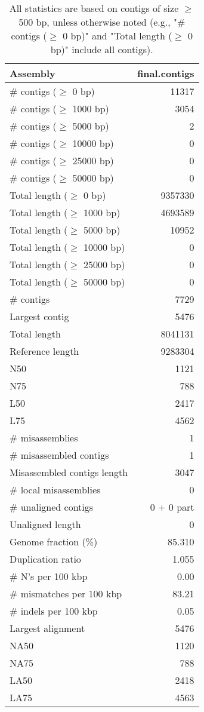 \documentclass[12pt,a4paper]{article}
\begin{document}
\begin{table}[ht]
\begin{center}
\caption{All statistics are based on contigs of size $\geq$ 500 bp, unless otherwise noted (e.g., "\# contigs ($\geq$ 0 bp)" and "Total length ($\geq$ 0 bp)" include all contigs).}
\begin{tabular}{|l*{1}{|r}|}
\hline
Assembly & final.contigs \\ \hline
\# contigs ($\geq$ 0 bp) & 11317 \\ \hline
\# contigs ($\geq$ 1000 bp) & 3054 \\ \hline
\# contigs ($\geq$ 5000 bp) & 2 \\ \hline
\# contigs ($\geq$ 10000 bp) & 0 \\ \hline
\# contigs ($\geq$ 25000 bp) & 0 \\ \hline
\# contigs ($\geq$ 50000 bp) & 0 \\ \hline
Total length ($\geq$ 0 bp) & 9357330 \\ \hline
Total length ($\geq$ 1000 bp) & 4693589 \\ \hline
Total length ($\geq$ 5000 bp) & 10952 \\ \hline
Total length ($\geq$ 10000 bp) & 0 \\ \hline
Total length ($\geq$ 25000 bp) & 0 \\ \hline
Total length ($\geq$ 50000 bp) & 0 \\ \hline
\# contigs & 7729 \\ \hline
Largest contig & 5476 \\ \hline
Total length & 8041131 \\ \hline
Reference length & 9283304 \\ \hline
N50 & 1121 \\ \hline
N75 & 788 \\ \hline
L50 & 2417 \\ \hline
L75 & 4562 \\ \hline
\# misassemblies & 1 \\ \hline
\# misassembled contigs & 1 \\ \hline
Misassembled contigs length & 3047 \\ \hline
\# local misassemblies & 0 \\ \hline
\# unaligned contigs & 0 + 0 part \\ \hline
Unaligned length & 0 \\ \hline
Genome fraction (\%) & 85.310 \\ \hline
Duplication ratio & 1.055 \\ \hline
\# N's per 100 kbp & 0.00 \\ \hline
\# mismatches per 100 kbp & 83.21 \\ \hline
\# indels per 100 kbp & 0.05 \\ \hline
Largest alignment & 5476 \\ \hline
NA50 & 1120 \\ \hline
NA75 & 788 \\ \hline
LA50 & 2418 \\ \hline
LA75 & 4563 \\ \hline
\end{tabular}
\end{center}
\end{table}
\end{document}
